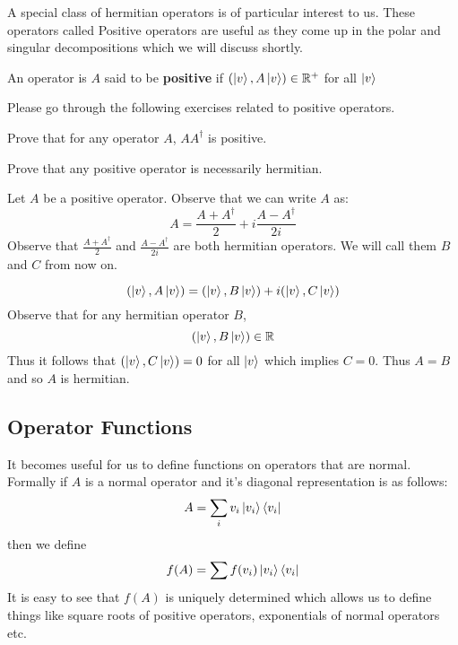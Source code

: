 A special class of hermitian operators is of particular interest to us. These operators called Positive operators are useful as they come up in the polar and singular decompositions which we will discuss shortly.
\begin{definition}
An operator is $A$ said to be \textbf{positive} if $(\ket{v}, A\ket{v}) \in \mathbb{R}^{+}$ for all $\ket{v}$
\end{definition}

Please go through the following exercises related  to positive operators.
\begin{exercise}
Prove that for any operator $A$, $AA^\dagger$ is positive.
\end{exercise}
\begin{exercise}
Prove that any positive operator is necessarily hermitian.
\end{exercise}
\begin{solution}
Let  $A$ be a positive operator. Observe that we can write  $A$ as:
$$ A = \frac{A+A^\dagger}{2} + i\frac{A-A^\dagger}{2i}$$
Observe that $\frac{A+A^\dagger}{2}$ and $\frac{A-A^\dagger}{2i}$ are both hermitian operators. We will call them $B$ and $C$ from now on.

$$(\ket{v}, A\ket{v}) = (\ket{v}, B\ket{v}) + i(\ket{v}, C\ket{v})$$
Observe that for any hermitian operator $B$, 
$$ (\ket{v}, B\ket{v}) \in \mathbb{R}$$
Thus it follows that $ (\ket{v}, C\ket{v}) = 0$ for all $\ket{v}$ which implies $C = 0$. Thus $A = B$ and so $A$ is hermitian.
\end{solution}

\subsection{Operator Functions}
It becomes useful for us to define functions on operators that are normal. Formally if $A$ is a normal operator and it's diagonal representation is as follows:
$$ A = \sum_i v_i \ket{v_i}\bra{v_i}$$ 
then we define $$f(A) = \sum f(v_i) \ket{v_i}\bra{v_i}$$
It is easy to see that $f(A)$ is uniquely determined which allows us to define things like square roots of positive operators, exponentials of normal operators etc.

